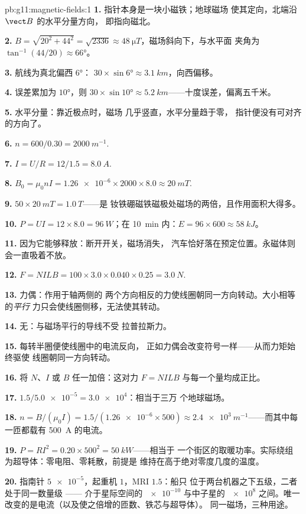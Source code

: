 \begin{solution}{pb:g11:magnetic-fields:1}
\textbf{1.} 指针本身是一块小磁铁；地球磁场
使其定向，北端沿 $\vect B$ 的水平分量方向，
即指向磁北。

\textbf{2.} $B = \sqrt{20^2 + 44^2} = \sqrt{2336} \approx
\qty{48}{\micro T}$，磁场斜向下，与水平面
夹角为 $\tan^{-1}(44/20) \approx \ang{66}$。

\textbf{3.} 航线为真北偏西 $\ang{6}$：
$30 \times \sin\ang{6} \approx \qty{3.1}{km}$，向西偏移。

\textbf{4.} 误差累加为 $\ang{10}$，则 $30 \times \sin\ang{10} \approx
\qty{5.2}{km}$——十度误差，偏离五千米。

\textbf{5.} 水平分量：靠近极点时，磁场
几乎竖直，水平分量趋于零，
指针便没有可对齐的方向了。

\textbf{6.} $n = 600/0.30 = \qty{2000}{m^{-1}}$.

\textbf{7.} $I = U/R = 12/1.5 = \qty{8.0}{A}$.

\textbf{8.} $B_0 = \mu_0 n I = \num{1.26e-6} \times 2000 \times 8.0
\approx \qty{20}{mT}$.

\textbf{9.} $50 \times \qty{20}{mT} = \qty{1.0}{T}$——是
钕铁硼磁铁磁极处磁场的两倍，且作用面积大得多。

\textbf{10.} $P = UI = 12 \times 8.0 = \qty{96}{W}$；在
\qty{10}{\minute} 内：$E = 96 \times 600 \approx \qty{58}{kJ}$。

\textbf{11.} 因为它能够释放：断开开关，磁场消失，
汽车恰好落在预定位置。永磁体则会一直吸着不放。

\textbf{12.} $F = NILB = 100 \times 3.0 \times 0.040 \times 0.25 =
\qty{3.0}{N}$.

\textbf{13.} 力偶：作用于轴两侧的
两个方向相反的力使线圈朝同一方向转动。大小相等的\emph{平行}
力只会使线圈侧移，无法使其转动。

\textbf{14.} 无：与磁场平行的导线不受
拉普拉斯力。

\textbf{15.} 每转半圈便使线圈中的电流反向，
正如力偶会改变符号一样——从而力矩始终驱使
线圈朝同一方向转动。

\textbf{16.} 将 $N$、$I$ 或 $B$ 任一加倍：这对力
$F = NILB$ 与每一个量均成正比。

\textbf{17.} $1.5 / \num{5.0e-5} = \num{3.0e4}$：相当于三万
个地球磁场。

\textbf{18.} $n = B/(\mu_0 I) = 1.5 / (\num{1.26e-6} \times 500)
\approx \qty{2.4e3}{m^{-1}}$——而其中每一匝都载有
\qty{500}{A} 的电流。

\textbf{19.} $P = RI^2 = 0.20 \times 500^2 = \qty{50}{kW}$——相当于
一个街区的取暖功率。实际绕组
为超导体：零电阻、零耗散，前提是
维持在高于绝对零度几度的温度。

\textbf{20.} 指南针 $\num{5e-5}$，起重机 $1$，MRI $1.5$：船只
位于两台机器之下五级，二者处于同一数量级 ——
介于星际空间的 $\num{e-10}$ 与中子星的 $\num{e8}$ 之间。唯一
改变的是电流（以及使之倍增的匝数、铁芯与超导体）。
同一磁场，三种用途。
\end{solution}
